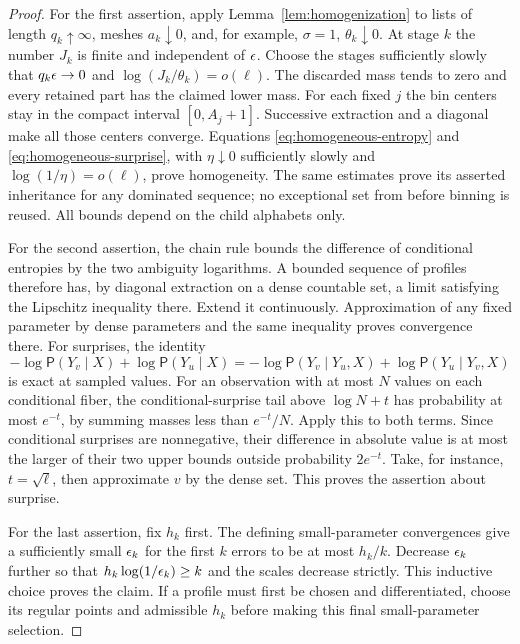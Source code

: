\begin{proof}
For the first assertion, apply Lemma~\ref{lem:homogenization} to
lists of length $q_k\uparrow\infty$, meshes $a_k\downarrow0$,
and, for example, $\sigma=1$, $\theta_k\downarrow0$.
At stage $k$ the number $J_k$ is finite and independent of $\epsilon$.
Choose the stages sufficiently slowly that
$q_k\epsilon\to0$ and
$\log(J_k/\theta_k)=o(\ell)$.
The discarded mass tends to zero and every retained part has the
claimed lower mass.  For each fixed $j$ the bin centers stay in the
compact interval $[0,A_j+1]$.  Successive extraction and a diagonal
make all those centers converge.  Equations
\eqref{eq:homogeneous-entropy} and
\eqref{eq:homogeneous-surprise}, with $\eta\downarrow0$
sufficiently slowly and $\log(1/\eta)=o(\ell)$, prove homogeneity.
The same estimates prove its asserted inheritance for any dominated
sequence; no exceptional set from before binning is reused.
All bounds depend on the child alphabets only.

For the second assertion, the chain rule bounds the difference of
conditional entropies by the two ambiguity logarithms.
A bounded sequence of profiles therefore has, by diagonal extraction
on a dense countable set, a limit satisfying the Lipschitz inequality
there.  Extend it continuously.  Approximation of any fixed parameter
by dense parameters and the same inequality proves convergence there.
For surprises, the identity
\[
 -\log\mathsf P(Y_v\mid X)+\log\mathsf P(Y_u\mid X)
 =-\log\mathsf P(Y_v\mid Y_u,X)
       +\log\mathsf P(Y_u\mid Y_v,X)
\]
is exact at sampled values.  For an observation with at most $N$
values on each conditional fiber, the conditional-surprise tail above
$\log N+t$ has probability at most $e^{-t}$, by summing masses
less than $e^{-t}/N$.  Apply this to both terms.  Since conditional
surprises are nonnegative, their difference in absolute value is
at most the larger of their two upper bounds outside probability
$2e^{-t}$.  Take, for instance, $t=\sqrt\ell$, then approximate
$v$ by the dense set.  This proves the assertion about surprise.

For the last assertion, fix $h_k$ first.  The defining small-parameter
convergences give a sufficiently small $\epsilon_k$ for the first $k$
errors to be at most $h_k/k$.  Decrease $\epsilon_k$ further so that
$h_k\log(1/\epsilon_k)\ge k$ and the scales decrease strictly.
This inductive choice proves the claim.  If a profile must first be
chosen and differentiated, choose its regular points and admissible
$h_k$ before making this final small-parameter selection.
\end{proof}

